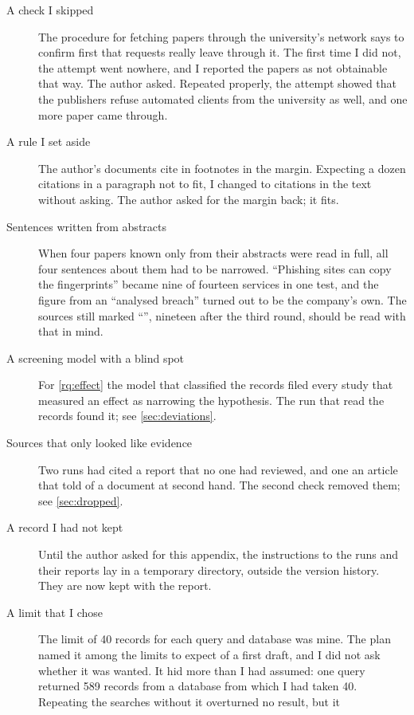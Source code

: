 \begin{description}
  \item[A check I skipped] The procedure for fetching papers through the
    university's network says to confirm first that requests really
    leave through it.
    The first time I did not, the attempt went nowhere, and I reported
    the papers as not obtainable that way.
    The author asked.
    Repeated properly, the attempt showed that the publishers refuse
    automated clients from the university as well, and one more paper
    came through.
  \item[A rule I set aside] The author's documents cite in footnotes in
    the margin.
    Expecting a dozen citations in a paragraph not to fit, I changed to
    citations in the text without asking.
    The author asked for the margin back; it fits.
  \item[Sentences written from abstracts] When four papers known only
    from their abstracts were read in full, all four sentences about
    them had to be narrowed.
    \enquote{Phishing sites can copy the fingerprints} became nine of
    fourteen services in one test, and the figure from an
    \enquote{analysed breach} turned out to be the company's own.
    The sources still marked \enquote{\abso}, nineteen after the
    third round, should be read with that in mind.
  \item[A screening model with a blind spot] For \cref{rq:effect} the
    model that classified the records filed every study that measured
    an effect as narrowing the hypothesis.
    The run that read the records found it; see \cref{sec:deviations}.
  \item[Sources that only looked like evidence] Two runs had cited a
    report that no one had reviewed, and one an article that told of a
    document at second hand.
    The second check removed them; see \cref{sec:dropped}.
  \item[A record I had not kept] Until the author asked for this
    appendix, the instructions to the runs and their reports lay in a
    temporary directory, outside the version history.
    They are now kept with the report.
  \item[A limit that I chose] The limit of 40 records for each query
    and database was mine.
    The plan named it among the limits to expect of a first draft, and
    I did not ask whether it was wanted.
    It hid more than I had assumed: one query returned 589 records from
    a database from which I had taken 40.
    Repeating the searches without it overturned no result, but it

\end{description}
